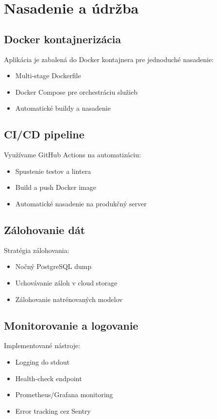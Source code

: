 \documentclass[12pt,a4paper]{article}
\begin{document}
\section{Nasadenie a údržba}
\subsection{Docker kontajnerizácia}
Aplikácia je zabalená do Docker kontajnera pre jednoduché nasadenie:
\begin{itemize}
    \item Multi-stage Dockerfile
    \item Docker Compose pre orchestráciu služieb
    \item Automatické buildy a nasadenie
\end{itemize}

\subsection{CI/CD pipeline}
Využívame GitHub Actions na automatizáciu:
\begin{itemize}
    \item Spustenie testov a lintera
    \item Build a push Docker image
    \item Automatické nasadenie na produkčný server
\end{itemize}

\subsection{Zálohovanie dát}
Stratégia zálohovania:
\begin{itemize}
    \item Nočný PostgreSQL dump
    \item Uchovávanie záloh v cloud storage
    \item Zálohovanie natrénovaných modelov
\end{itemize}

\subsection{Monitorovanie a logovanie}
Implementované nástroje:
\begin{itemize}
    \item Logging do stdout
    \item Health-check endpoint
    \item Prometheus/Grafana monitoring
    \item Error tracking cez Sentry
\end{itemize}
\end{document}

